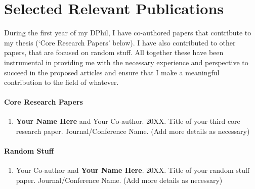 \chapter{Selected Relevant Publications}
During the first year of my DPhil, I have co-authored papers that contribute to my thesis (`Core Research Papers' below). I have also contributed to other papers, that are focused on random stuff. All together these have been instrumental in providing me with the necessary experience and perspective to succeed in the proposed articles and ensure that I make a meaningful contribution to the field of whatever.

\subsubsection{Core Research Papers} \label{}
\begin{enumerate}
    \item \textbf{Your Name Here} and Your Co-author. 20XX. Title of your third core research paper. Journal/Conference Name. (Add more details as necessary)
\end{enumerate}

\subsubsection{Random Stuff}
\begin{enumerate}
    \item Your Co-author and \textbf{Your Name Here}. 20XX. Title of your random stuff paper. Journal/Conference Name. (Add more details as necessary)
\end{enumerate}
